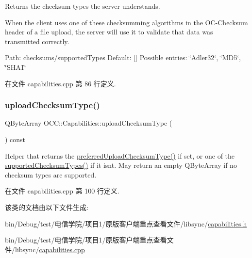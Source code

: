 Returns the checksum types the server understands.

When the client uses one of these checksumming algorithms in the O\+C-\/\+Checksum header of a file upload, the server will use it to validate that data was transmitted correctly.

Path\+: checksums/supported\+Types Default\+: \mbox{[}\mbox{]} Possible entries\+: \char`\"{}\+Adler32\char`\"{}, \char`\"{}\+M\+D5\char`\"{}, \char`\"{}\+S\+H\+A1\char`\"{} 

在文件 capabilities.\+cpp 第 86 行定义.

\mbox{\label{class_o_c_c_1_1_capabilities_aabada7d4638d3e2fedf8651b46706fcf}} 
\subsubsection{\texorpdfstring{upload\+Checksum\+Type()}{uploadChecksumType()}}
{\footnotesize\ttfamily Q\+Byte\+Array O\+C\+C\+::\+Capabilities\+::upload\+Checksum\+Type (\begin{DoxyParamCaption}{ }\end{DoxyParamCaption}) const}

Helper that returns the \hyperlink{class_o_c_c_1_1_capabilities_a1472ad6e939b125731068ca8bdd99176}{preferred\+Upload\+Checksum\+Type()} if set, or one of the \hyperlink{class_o_c_c_1_1_capabilities_afc3e38d87609e09b13cfd6c757f35210}{supported\+Checksum\+Types()} if it isn\textquotesingle{}t. May return an empty Q\+Byte\+Array if no checksum types are supported. 

在文件 capabilities.\+cpp 第 100 行定义.



该类的文档由以下文件生成\+:\begin{DoxyCompactItemize}
\item 
bin/\+Debug/test/电信学院/项目1/原版客户端重点查看文件/libsync/\hyperlink{capabilities_8h}{capabilities.\+h}\item 
bin/\+Debug/test/电信学院/项目1/原版客户端重点查看文件/libsync/\hyperlink{capabilities_8cpp}{capabilities.\+cpp}\end{DoxyCompactItemize}
